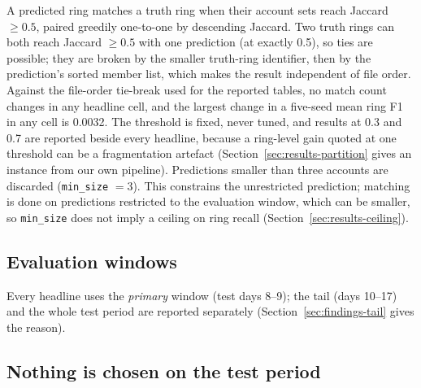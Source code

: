 A predicted ring matches a truth ring when their account sets reach Jaccard $\ge 0.5$, paired
greedily one-to-one by descending Jaccard. Two truth rings can both reach Jaccard $\ge 0.5$ with one
prediction (at exactly 0.5), so ties are possible; they are broken by the smaller truth-ring
identifier, then by the prediction's sorted member list, which makes the result independent of file
order. Against the file-order tie-break used for the reported tables, no match count changes in any
headline cell, and the largest change in a five-seed mean ring F1 in any cell is 0.0032.
The threshold is fixed, never tuned, and results at 0.3 and 0.7 are reported beside every
headline, because a ring-level gain quoted at one threshold can be a fragmentation artefact
(Section~\ref{sec:results-partition} gives an instance from our own pipeline). Predictions
smaller than three accounts are discarded (\texttt{min\_size} $=3$). This constrains the
unrestricted prediction; matching is done on predictions restricted to the evaluation window,
which can be smaller, so \texttt{min\_size} does not imply a ceiling on ring recall
(Section~\ref{sec:results-ceiling}).

\subsection{Evaluation windows}
\label{sec:data-windows}

Every headline uses the \emph{primary} window (test days 8--9); the tail (days 10--17) and the
whole test period are reported separately (Section~\ref{sec:findings-tail} gives the reason).

\subsection{Nothing is chosen on the test period}

